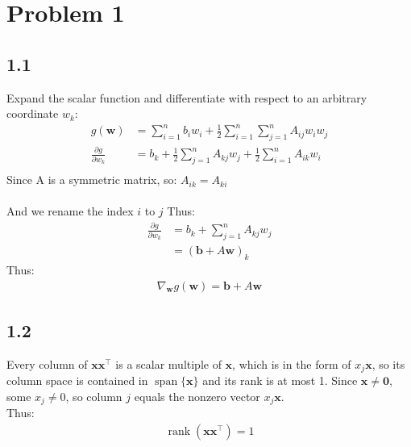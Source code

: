 \section*{Problem 1}

\subsection*{1.1}
Expand the scalar function and differentiate with respect to an arbitrary coordinate $w_k$:
\begin{align*}
g(\mathbf{w})&=\sum_{i=1}^{n}b_iw_i+\frac12\sum_{i=1}^{n}\sum_{j=1}^{n}A_{ij}w_iw_j\\
\frac{\partial g}{\partial w_k}
&=b_k+\frac12\sum_{j=1}^{n}A_{kj}w_j
       +\frac12\sum_{i=1}^{n}A_{ik}w_i\\
\end{align*}
Since A is a symmetric matrix, so: $A_{ik}=A_{ki}$\\
\\
And we rename the index $i$ to $j$
Thus:
\begin{align*}
\frac{\partial g}{\partial w_k}
&=b_k+\sum_{j=1}^{n}A_{kj}w_j\\
&=(\mathbf{b}+A\mathbf{w})_k
\end{align*}
Thus:\\
\begin{align*}
{\nabla_{\mathbf{w}}g(\mathbf{w})=\mathbf{b}+A\mathbf{w}}
\end{align*}

\subsection*{1.2}
Every column of $\mathbf{x}\mathbf{x}^{\top}$ is a scalar multiple of $\mathbf{x}$, which is in the form of $x_j\mathbf{x}$, so its column space is contained in $\operatorname{span}\{\mathbf{x}\}$ and its rank is at most 1. Since $\mathbf{x}\ne\mathbf{0}$, some $x_j\ne0$, so column $j$ equals the nonzero vector $x_j\mathbf{x}$.\\
Thus:\\
\begin{align*}
\operatorname{rank}(\mathbf{x}\mathbf{x}^{\top})=1
\end{align*}

